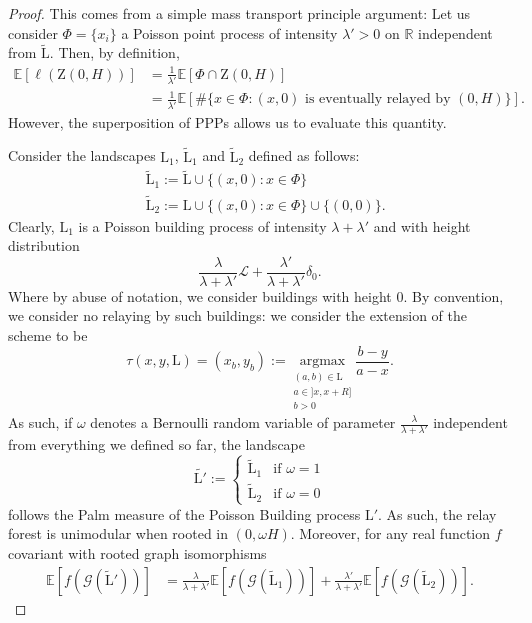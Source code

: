 \documentclass[10pt,english,a4paper]{smfart}
\theoremstyle{definition}
\theoremstyle{remark}
\newcommand{\R}{\mathbb{R}}
\newcommand{\landsc}{\mathrm{L}}
\newcommand{\zone}{\mathrm{Z}}
\newcommand{\e}{\mathbb{E}}
\begin{document}
\begin{proof}
This comes from a simple mass transport principle argument: Let us consider $\Phi = \{x_i\}$ a Poisson point process of intensity $\lambda'>0$ on $\R$ independent from $\tilde{\landsc}$. Then, by definition,
\begin{align*}
\e[\ell(\zone(0, H))] &= \frac{1}{\lambda'}\e[\Phi\cap \zone(0, H)]\\
&= \frac{1}{\lambda'}\e[\# \{x\in \Phi: (x, 0)\text{ is eventually relayed by } (0, H)\}].
\end{align*}
However, the superposition of PPPs allows us to evaluate this quantity.

Consider the landscapes $\landsc_1$, $\tilde{\landsc}_1$ and $\tilde{\landsc}_2$ defined as follows:
\begin{align*}
    &\tilde{\landsc}_1 := \tilde{\landsc}\cup \{(x, 0): x\in \Phi\}\\
    &\tilde{\landsc}_2 := \landsc\cup \{(x, 0): x\in \Phi\}\cup \{(0, 0)\}.
\end{align*}
Clearly, $\landsc_1$ is a Poisson building process of intensity $\lambda +\lambda'$ and with height distribution
\[\frac{\lambda}{\lambda+\lambda'}\mathcal{L}+\frac{\lambda'}{\lambda + \lambda'} \delta_0.\]
Where by abuse of notation, we consider buildings with height $0$. By convention, we consider no relaying by such buildings: we consider the extension of the scheme to be
\[\tau (x, y, \landsc) = (x_b, y_b) := \underset{\substack{(a, b) \in \landsc \\a\in ]x, x+R]\\b>0}}{\text{argmax}} \frac{b-y}{a-x}.\]
As such, if $\omega$ denotes a Bernoulli random variable of parameter $\frac{\lambda}{\lambda+\lambda'}$ independent from everything we defined so far, the landscape
$$\tilde{\landsc'}:=\left\{
    \begin{array}{ll}
        \tilde{\landsc}_1 & \mbox{if } \omega = 1 \\
        \tilde{\landsc}_2 & \mbox{if }\omega=0
    \end{array}
\right.$$
follows the Palm measure of the Poisson Building process $\landsc'$. As such, the relay forest is unimodular when rooted in $(0, \omega H)$. Moreover, for any real function $f$ covariant with rooted graph isomorphisms
\begin{align*}
    \e[f(\mathcal{G}( \tilde{\landsc}'))]  &= \frac{\lambda}{\lambda+\lambda'}\e[f(\mathcal{G}( \tilde{\landsc}_1))] + \frac{\lambda'}{\lambda+\lambda'}\e[f(\mathcal{G}( \tilde{\landsc}_2))].
\end{align*}

\end{proof}
\end{document}

